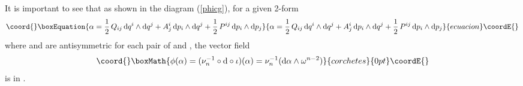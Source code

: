 \documentclass[12pt,a4paper]{article}
\providecommand{\dd}{\mathrm{d}}
\providecommand{\XH}{\mathcal{X}_{\mathrm{H}}}
\begin{document}
It is important to see that as shown in the diagram (\ref{phicg}),
for a given 2-form
\begin{equation}\coord{}\boxEquation{
  \alpha = \frac{1}{2}\,Q_{ij}\,\dd q^i\wedge\dd q^j
  + A^i_j\,\dd p_i\wedge\dd q^j + \frac{1}{2}\,P^{ij}\,\dd p_i\wedge\dd p_j
\label{alpha}
}{
  \alpha = \frac{1}{2}\,Q_{ij}\,\dd q^i\wedge\dd q^j
  + A^i_j\,\dd p_i\wedge\dd q^j + \frac{1}{2}\,P^{ij}\,\dd p_i\wedge\dd p_j
}{ecuacion}\coordE{}\end{equation}
where \coordHE{} and \coordHE{} are antisymmetric for each pair of \coordHE{} and \coordHE{},
the vector field
\begin{displaymath}\coord{}\boxMath{
  \phi(\alpha) = (\nu_n^{-1}\circ\dd\circ\iota)(\alpha)
  = \nu^{-1}_n(\dd\alpha\wedge\omega^{n-2})
}{corchetes}{0pt}\coordE{}\end{displaymath}
is in \myHighlight{$\XH^{2n-1}(\mathcal{M},\omega)$}\coordHE{}.
\end{document}
